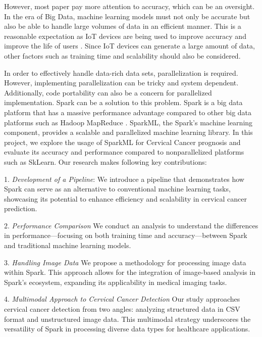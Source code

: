 \documentclass[12pt]{report}
\begin{document}
However, most paper pay more attention to accuracy, which can be an oversight. In the era of Big Data, machine learning models must not only be accurate but also be able to handle large volumes of data in an efficient manner. This is a reasonable expectation as IoT devices are being used to improve accuracy and improve the life of users \cite{IoT}. Since IoT devices can generate a large amount of data, other factors such as training time and scalability should also be considered.

In order to effectively handle data-rich data sets, parallelization is required\cite{dobre2014parallel}. However, implementing parallelization can be tricky and system dependent. Additionally, code portability can also be a concern for parallelized implementation. Spark can be a solution to this problem. Spark is a big data platform that has a massive performance advantage compared to other big data platforms such as Hadoop MapReduce \cite{sparkvsmapreduce}. SparkML, the Spark's machine learning component, provides a scalable and parallelized machine learning library. In this project, we explore the usage of SparkML for Cervical Cancer prognosis and evaluate its accuracy and performance compared to nonparallelized platforms such as SkLearn. Our research makes following key contributions:

1.  \textit{Development of a Pipeline}: We introduce a pipeline that demonstrates how Spark can serve as an alternative to conventional machine learning tasks, showcasing its potential to enhance efficiency and scalability in cervical cancer prediction.

2.  \textit{Performance Comparison} We conduct an analysis to understand the differences in performance—focusing on both training time and accuracy—between Spark and traditional machine learning models. 

3.  \textit{Handling Image Data} We propose a methodology for processing image data within Spark. This approach allows for the integration of image-based analysis in Spark's ecosystem, expanding its applicability in medical imaging tasks.

4.  \textit{Multimodal Approach to Cervical Cancer Detection} Our study approaches cervical cancer detection from two angles: analyzing structured data in CSV format and unstructured image data. This multimodal strategy underscores the versatility of Spark in processing diverse data types for healthcare applications.
\end{document}
